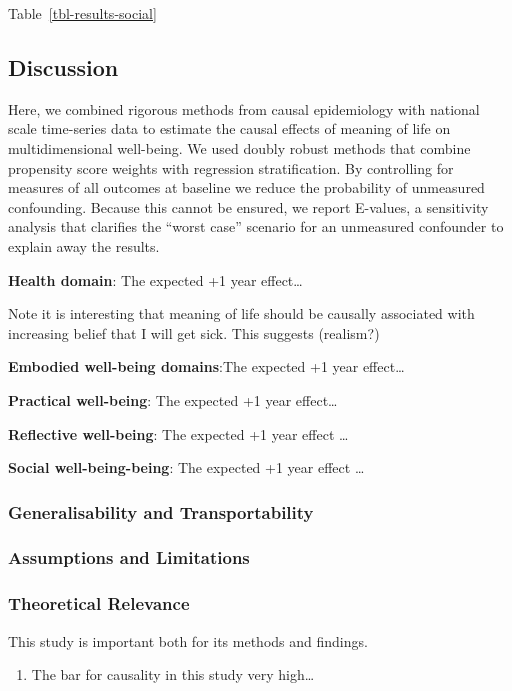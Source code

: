 \documentclass[
  singlecolumn,
  9pt]{scrartcl}
\providecommand{\tightlist}{%
  \setlength{\itemsep}{0pt}\setlength{\parskip}{0pt}}\usepackage{longtable,booktabs,array}
\begin{document}
Table~\ref{tbl-results-social}

\subsection{Discussion}\label{discussion}

Here, we combined rigorous methods from causal epidemiology with
national scale time-series data to estimate the causal effects of
meaning of life on multidimensional well-being. We used doubly robust
methods that combine propensity score weights with regression
stratification. By controlling for measures of all outcomes at baseline
we reduce the probability of unmeasured confounding. Because this cannot
be ensured, we report E-values, a sensitivity analysis that clarifies
the ``worst case'' scenario for an unmeasured confounder to explain away
the results.

\textbf{Health domain}: The expected +1 year effect\ldots{}

Note it is interesting that meaning of life should be causally
associated with increasing belief that I will get sick. This suggests
(realism?)

\textbf{Embodied well-being domains}:The expected +1 year effect\ldots{}

\textbf{Practical well-being}: The expected +1 year effect\ldots{}

\textbf{Reflective well-being}: The expected +1 year effect \ldots{}

\textbf{Social well-being-being}: The expected +1 year effect \ldots{}

\subsubsection{Generalisability and
Transportability}\label{generalisability-and-transportability}

\subsubsection{Assumptions and
Limitations}\label{assumptions-and-limitations}

\subsubsection{Theoretical Relevance}\label{theoretical-relevance}

This study is important both for its methods and findings.

\begin{enumerate}
\def\labelenumi{\arabic{enumi}.}
\tightlist
\item
  The bar for causality in this study very high\ldots{}
\end{enumerate}
\end{document}
